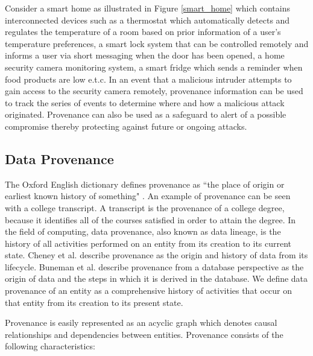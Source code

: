 \documentclass[conference]{IEEEtran}
\begin{document}
Consider a smart home as illustrated in Figure \ref{smart_home} which contains interconnected devices such as a thermostat which automatically detects and regulates the temperature of a room based on prior information of a user's temperature preferences, a smart lock system that can be controlled remotely and informs a user via short messaging when the door has been opened, a home security camera monitoring system, a smart fridge which sends a reminder when food products are low e.t.c. In an event that a malicious intruder attempts  to gain access to the security camera remotely, provenance information can be used to track the series  of events to determine where and how a malicious attack originated. Provenance can also be used as a safeguard to alert of a possible  compromise thereby protecting against future or ongoing attacks. 



\subsection{Data Provenance}

The Oxford English dictionary defines provenance as ``the place of origin or earliest
known history of something" \cite{TCDP1999}. An example of provenance can be seen with a college transcript. A transcript is the provenance of a college degree, because it identifies all of the
courses satisfied in order to attain the degree. In the field of computing, data provenance, also known as data lineage, is the history of all activities performed on an entity from its creation to its current state.
Cheney et al. \cite{cheney_provenance_2009}  describe provenance as the origin and history of data from its lifecycle. Buneman et al. \cite{buneman_why_2001} describe provenance from a database perspective as the origin of data and the steps in which it is derived in the database. We define data provenance of an entity as a comprehensive history of activities that occur on that entity from its creation to its present state.


Provenance is easily represented as an acyclic graph which denotes causal relationships and dependencies between entities. Provenance consists of the following characteristics:
 
\end{document}
